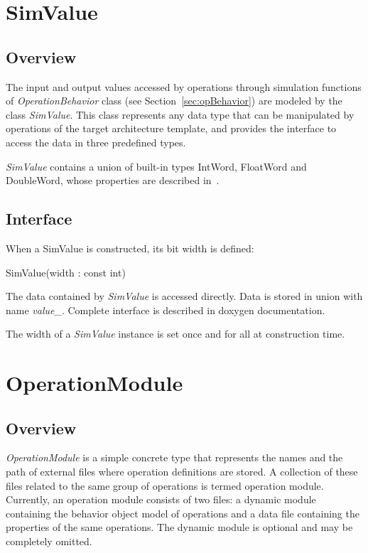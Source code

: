 \documentclass[a4paper,twoside]{tce}
\begin{document}
\section{SimValue}
\label{sec:simValue}

\subsection{Overview}

The input and output values accessed by operations through simulation
functions of \emph{OperationBehavior} class (see Section~\ref{sec:opBehavior}) 
are modeled by the class \emph{SimValue}.
This class represents any data type that can be manipulated by operations of
the target architecture template, and provides the interface to access the
data in three predefined types.

\emph{SimValue} contains a union of built-in types IntWord, FloatWord and
DoubleWord, whose properties are described in~\cite{OSAL-specs}.

\subsection{Interface}

When a SimValue is constructed, its bit width is defined:
\begin{description}
\item[SimValue(width : const int)]
\end{description}

The data contained by \emph{SimValue} is accessed directly. Data is stored
in union with name \emph{value\_}. Complete interface is described in doxygen 
documentation.

The width of a \emph{SimValue} instance is set once and for all at
construction time.

\section{OperationModule}
\label{sec:opModule}

\subsection{Overview}

\emph{OperationModule} is a simple concrete type that represents the names
and the path of external files where operation definitions are stored.  A
collection of these files related to the same group of operations is termed
operation module.  Currently, an operation module consists of two files: a
dynamic module containing the behavior object model of operations and a
data file containing the properties of the same operations.  The dynamic
module is optional and may be completely omitted.
\end{document}
